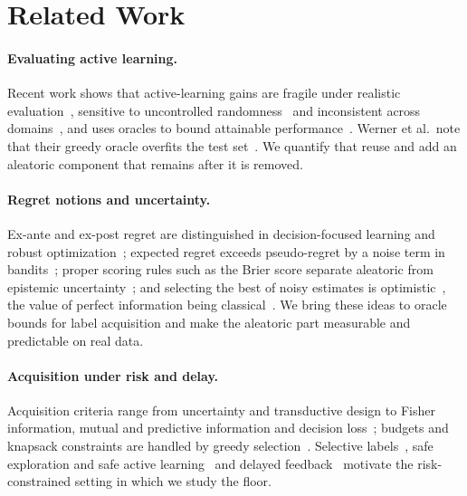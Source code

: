 \documentclass[runningheads]{llncs}
\begin{document}
\section{Related Work}
\label{sec:related}
\paragraph{Evaluating active learning.} Recent work shows that active-learning gains are fragile under realistic evaluation~\cite{luth2023navigating}, sensitive to uncontrolled randomness~\cite{ji2023randomness} and inconsistent across domains~\cite{werner2023comparable,werner2024cdalbench}, and uses oracles to bound attainable performance~\cite{werner2024cdalbench,huseljic2026boss}. Werner et al.\ note that their greedy oracle overfits the test set~\cite{werner2023comparable}. We quantify that reuse and add an aleatoric component that remains after it is removed.

\paragraph{Regret notions and uncertainty.} Ex-ante and ex-post regret are distinguished in decision-focused learning and robust optimization~\cite{schutte2023robust}; expected regret exceeds pseudo-regret by a noise term in bandits~\cite{bubeck2012regret,audibert2010regret}; proper scoring rules such as the Brier score separate aleatoric from epistemic uncertainty~\cite{hofman2024quantifying}; and selecting the best of noisy estimates is optimistic~\cite{smith2006optimizer,cawley2010overfitting}, the value of perfect information being classical~\cite{howard1966information,raiffa1961applied}. We bring these ideas to oracle bounds for label acquisition and make the aleatoric part measurable and predictable on real data.

\paragraph{Acquisition under risk and delay.} Acquisition criteria range from uncertainty and transductive design to Fisher information, mutual and predictive information and decision loss~\cite{cohn1996active,settles2009active,lewis1994sequential,yu2006transductive,ash2021fishing,kirsch2019batchbald,bickfordsmith2023prediction,huang2026loss,chaloner1995bayesian}; budgets and knapsack constraints are handled by greedy selection~\cite{krause2005near,sviridenko2004note,tomanek2010cost}. Selective labels~\cite{lakkaraju2017selective,wei2021selective,kilbertus2020fair,keswani2024partial,crook2004reject}, safe exploration and safe active learning~\cite{sui2015safe,schreiter2015safe,wu2016conservative} and delayed feedback~\cite{joulani2013delayed,chapelle2014delayed,pham2022latency} motivate the risk-constrained setting in which we study the floor.
\end{document}
